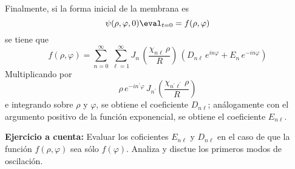 Finalmente, si la forma inicial de la membrana es
\[ \psi (\rho, \varphi, 0)\eval_{t=0} = f (\rho, \varphi) \]
se tiene que
\[ f (\rho, \varphi) = \sum_{n=0}^{\infty} \, \sum_{\ell=1}^{\infty} J_{n} \, \left( \dfrac{\chi_{n \ell} \, \rho}{R} \right) \, \left( D_{n \ell} \, e^{i n \varphi} + E_{n} \, e^{-i n \varphi} \right) \]
Multiplicando por 
\[ \rho \, e^{-i n^{\prime} \varphi} \, J_{n^{\prime}} \left( \dfrac{\chi_{n^{\prime} \ell^{\prime}} \, \rho}{R} \right) \]
e integrando sobre $\rho$ y $\varphi$, se obtiene el coeficiente $D_{n \ell}$; análogamente con el argumento positivo de la función exponencial, se obtiene el coeficiente $E_{n \ell}$.
\par
\textbf{Ejercicio a cuenta: } Evaluar los coficientes $E_{n \ell}$ y $D_{n \ell}$ en el caso de que la función $f(\rho, \varphi)$ sea sólo $f(\varphi)$. Analiza y disctue los primeros modos de oscilación.
